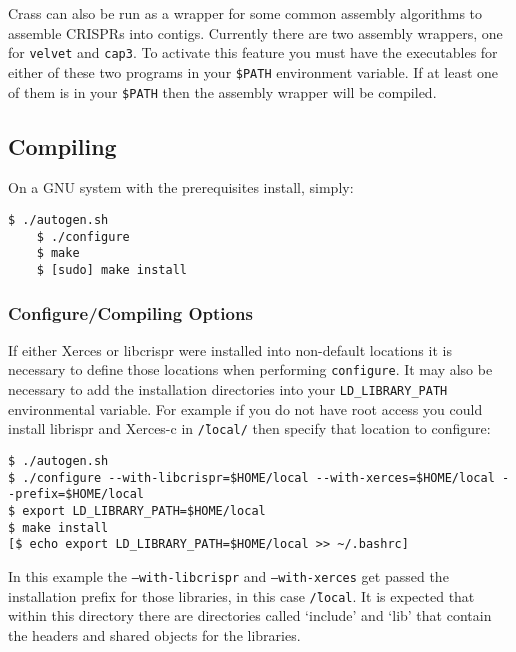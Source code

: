 \documentclass[11pt]{article} %
\begin{document}
Crass can also be run as a wrapper for some common assembly algorithms to assemble CRISPRs into contigs.  Currently there are two assembly wrappers, one for \texttt{velvet} and \texttt{cap3}. To activate this feature you must have the executables for either of these two programs in your \texttt{\$PATH} environment variable.  If at least one of them is in your \texttt{\$PATH} then the assembly wrapper will be compiled.  

\subsection{Compiling}
On a GNU system with the prerequisites install, simply:
\begin{lstlisting}[style=BashInputStyle]
	$ ./autogen.sh
	$ ./configure
	$ make
	$ [sudo] make install
\end{lstlisting}

\subsubsection{Configure/Compiling Options}
\label{sec:configure}
If either Xerces or libcrispr were installed into non-default locations it is necessary to define those locations when performing \lstinline$configure$.  It may also be necessary to add the installation directories into your \lstinline$LD_LIBRARY_PATH$ environmental variable.  For example if you do not have root access you could install librispr and Xerces-c in \texttt{\~/local/} then specify that location to configure: 
\begin{lstlisting}[style=BashInputStyle]
$ ./autogen.sh
$ ./configure --with-libcrispr=$HOME/local --with-xerces=$HOME/local --prefix=$HOME/local
$ export LD_LIBRARY_PATH=$HOME/local
$ make install
[$ echo export LD_LIBRARY_PATH=$HOME/local >> ~/.bashrc] 
\end{lstlisting}

In this example the \texttt{--with-libcrispr} and \texttt{--with-xerces} get passed the installation prefix for those libraries, in this case \texttt{\~/local}.  It is expected that within this directory there are directories called `include' and `lib' that contain the headers and shared objects for the libraries.
\end{document}
